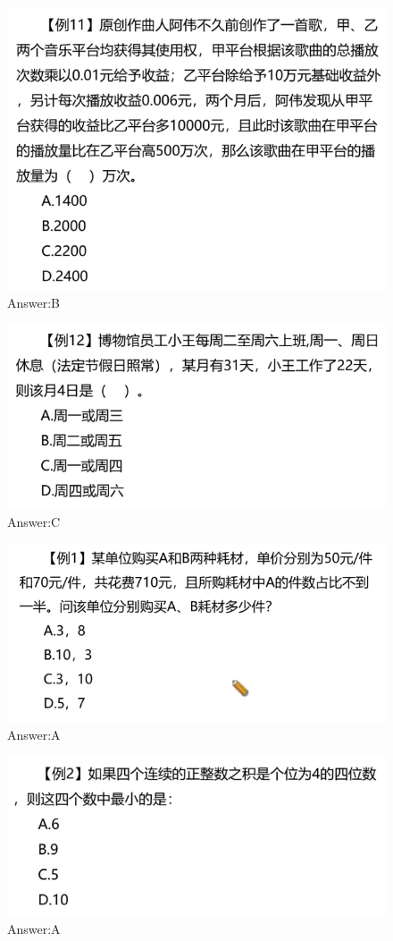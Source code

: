 \documentclass{article}
\numberwithin{equation}{section}						%
\numberwithin{figure}{section}							%
\begin{document}
\begin{sloppypar}
\begin{figure}[H]
     \centering
     \includegraphics[width=0.6\linewidth]{246.png}
		\caption{Answer:B}
\end{figure}


\begin{figure}[H]
     \centering
     \includegraphics[width=0.6\linewidth]{247.png}
		\caption{Answer:C}
\end{figure}


\begin{figure}[H]
     \centering
     \includegraphics[width=0.6\linewidth]{248.png}
		\caption{Answer:A}
\end{figure}

\begin{figure}[H]
     \centering
     \includegraphics[width=0.6\linewidth]{249.png}
		\caption{Answer:A}
\end{figure}


\end{sloppypar}
\end{document}
